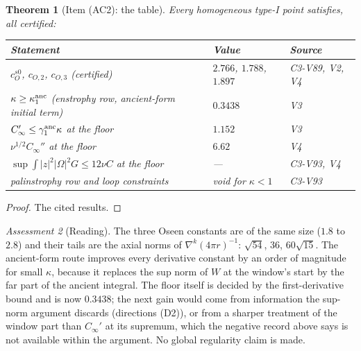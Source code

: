 \documentclass[11pt]{article}
\theoremstyle{plain}
\newtheorem{theorem}{Theorem}[section]
\theoremstyle{definition}
\theoremstyle{remark}
\newtheorem{assessment}[theorem]{Assessment}
\begin{document}
\begin{theorem}[Item (AC2): the table]
\label{thm:c4v4-table}
Every homogeneous type-I point satisfies, all certified:

\medskip
\begin{center}\small
\begin{tabular}{@{}p{}p{}p{}@{}}
\toprule
\textbf{Statement} & \textbf{Value} & \textbf{Source}\\
\midrule
\(c_O^{s0}\), \(c_{O,2}\), \(c_{O,3}\) (certified) & \(2.766\), \(1.788\), \(1.897\) & C3-V89, V2, V4\\
\(\kappa\ge\kappa_1^{\rm anc}\) (enstrophy row, ancient-form initial term) & \(\mathbf{0.3438}\) & V3\\
\(C_\infty'\le\gamma_1^{\rm anc}\kappa\) at the floor & \(1.152\) & V3\\
\(\nu^{1/2}C_\infty''\) at the floor & \(6.62\) & V4\\
\(\sup\int|z|^2|\Omega|^2G\le12\nu C\) at the floor & --- & C3-V93, V4\\
palinstrophy row and loop constraints & void for \(\kappa<1\) & C3-V93\\
\bottomrule
\end{tabular}
\end{center}
\medskip
\end{theorem}

\begin{proof}
The cited results.
\end{proof}

\begin{assessment}[Reading]
\label{ass:c4v4-reading}
The three Oseen constants are of the same size (\(1.8\) to \(2.8\)) and
their tails are the axial norms of \(\nabla^k(4\pi r)^{-1}\): \(\sqrt{54}\), \(36\), \(60\sqrt{15}\).  The
ancient-form route improves every derivative constant by an order of
magnitude for small \(\kappa\), because it replaces the sup norm of \(W\) at
the window's start by the far part of the ancient integral.  The
floor itself is decided by the first-derivative bound and is now
\(0.3438\); the next gain would come from information the sup-norm
argument discards (directions (D2)), or from a sharper treatment of
the window part than \(C_\infty'\) at its supremum, which the negative record
above says is not available within the argument.  No global
regularity claim is made.
\end{assessment}

\end{document}
